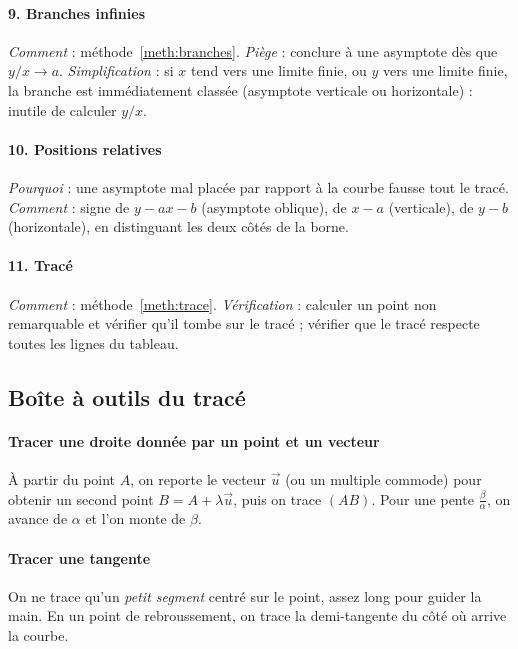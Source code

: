 \documentclass[a4paper,11pt]{article}
\numberwithin{equation}{section}
\numberwithin{figure}{section}
\numberwithin{table}{section}
\theoremstyle{enonce}
\theoremstyle{exemple}
\theoremstyle{remarque}
\newcommand{\ve}[1]{\vec{#1}}
\begin{document}
\paragraph{9. Branches infinies}
\emph{Comment} : méthode~\ref{meth:branches}. \emph{Piège} : conclure à une asymptote dès que $y/x\to a$.
\emph{Simplification} : si $x$ tend vers une limite finie, ou $y$ vers une limite finie, la branche est immédiatement classée
(asymptote verticale ou horizontale) : inutile de calculer $y/x$.

\paragraph{10. Positions relatives}
\emph{Pourquoi} : une asymptote mal placée par rapport à la courbe fausse tout le tracé. \emph{Comment} : signe de $y-ax-b$
(asymptote oblique), de $x-a$ (verticale), de $y-b$ (horizontale), en distinguant les deux côtés de la borne.

\paragraph{11. Tracé}
\emph{Comment} : méthode~\ref{meth:trace}. \emph{Vérification} : calculer un point non remarquable et vérifier qu'il tombe sur
le tracé ; vérifier que le tracé respecte toutes les lignes du tableau.

\subsection{Boîte à outils du tracé}

\paragraph{Tracer une droite donnée par un point et un vecteur} À partir du point $A$, on reporte le vecteur $\ve u$ (ou un
multiple commode) pour obtenir un second point $B=A+\lambda\ve u$, puis on trace $(AB)$. Pour une pente $\frac{\beta}{\alpha}$, on
avance de $\alpha$ et l'on monte de $\beta$.

\paragraph{Tracer une tangente} On ne trace qu'un \emph{petit segment} centré sur le point, assez long pour guider la main.
En un point de rebroussement, on trace la demi-tangente du côté où arrive la courbe.
\end{document}
